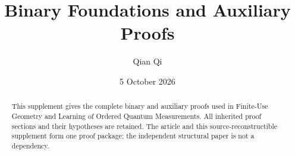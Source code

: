 \documentclass[11pt]{amsart}
\title[Binary foundations and auxiliary proofs]{Binary Foundations and Auxiliary Proofs}
\author{Qian Qi}
\date{5 October 2026}
\numberwithin{equation}{section}
\theoremstyle{definition}\newtheorem{definition}[theorem]{Definition}
\theoremstyle{remark}\newtheorem{remark}[theorem]{Remark}
\begin{document}
\raggedbottom
\begin{abstract}
This supplement gives the complete binary and auxiliary proofs used in
Finite-Use Geometry and Learning of Ordered Quantum Measurements.
All inherited proof sections and their hypotheses are retained.
The article and this source-reconstructible supplement form one proof
package; the independent structural paper is not a dependency.
\end{abstract}
\maketitle





















\end{document}
